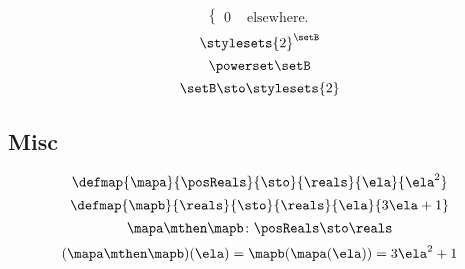 \begin{forslides}
\begin{equation}
\begin{cases}
            0 & \text{ elsewhere}.
        \end{cases}
    \end{equation}
    \begin{equation}
        \label{eq:slides_session2_195}
        \stylesets{2}^\setB
    \end{equation}
    \begin{equation}
        \label{eq:slides_session2_196}
        \powerset \setB
    \end{equation}
    \begin{equation}
        \label{eq:slides_session2_197}
        \setB \sto \stylesets{2}
    \end{equation}

    \subsection{Misc}

    \begin{equation}
        \label{eq:slides_session2_198}
        \defmap{\mapa}{\posReals}{\sto}{\reals}{\ela}{\ela^2}
    \end{equation}
    \begin{equation}
        \label{eq:slides_session2_199}
        \defmap{\mapb}{\reals}{\sto}{\reals}{\ela}{3\ela + 1}
    \end{equation}
    \begin{equation}
        \label{eq:slides_session2_200}
        \mapa \mthen \mapb \colon \posReals \sto \reals
    \end{equation}
    \begin{equation}
        \label{eq:slides_session2_201}
        (\mapa \mthen \mapb)(\ela) = \mapb(\mapa(\ela)) = 3 \ela^2 + 1
    \end{equation}

\end{forslides}

